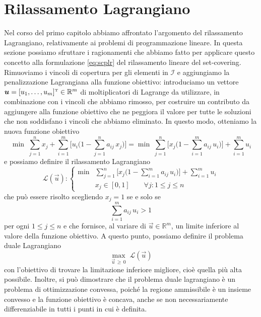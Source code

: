 \section{Rilassamento Lagrangiano}\label{sec:lagrangianrelaxationapplied}
Nel corso del primo capitolo abbiamo affrontato l'argomento del rilassamento Lagrangiano, relativamente ai problemi di
programmazione lineare. In questa sezione possiamo sfruttare i ragionamenti che abbiamo fatto per applicare questo
concetto alla formulazione \eqref{eq:scplr} del rilassamento lineare del set-covering. Rimuoviamo i vincoli di copertura
per gli elementi in \( \mathcal{I} \) e aggiungiamo la penalizzazione Lagrangiana alla funzione obiettivo: introduciamo
un vettore \( \bm{u} = [u_1, \ldots, u_m]^{\scriptscriptstyle\mathrm{T}} \in \mathbb{R}^m \) di moltiplicatori di Lagrange da utilizzare, in
combinazione con i vincoli che abbiamo rimosso, per costruire un contributo da aggiungere alla funzione obiettivo che ne
peggiora il valore per tutte le soluzioni che non soddisfano i vincoli che abbiamo eliminato. In questo modo, otteniamo
la nuova funzione obiettivo
\begin{equation}
    \min \; \sum_{j = 1}^n x_j + \sum_{i = 1}^m \Big[u_i \Big(1 - \sum_{j = 1}^n a_{ij}\, x_j\Big)\Big] =
    \min \; \sum_{j = 1}^n \Big[x_j\Big(1 - \sum_{i = 1}^m a_{ij}\, u_i \Big)\Big] + \sum_{i = 1}^m u_i
\end{equation}
e possiamo definire il rilassamento Lagrangiano
\begin{equation}\label{eq:Lu}
    \mathcal{L}(\vec{u})\colon
    \left\{
    \begin{array}{ll}
        \min & \displaystyle\sum_{j=1}^n \Big[x_j \Big(1 - \sum_{i = 1}^m a_{ij}\, u_i\Big)\Big] + \sum_{i = 1}^m u_i
        \\[20pt]
             & x_j \in [0, 1] \qquad \forall j\colon 1 \leq j \leq n
    \end{array}\right.
\end{equation}
che può essere risolto scegliendo \( x_j = 1\) se e solo se
\begin{equation}
    \sum_{i=1}^m a_{ij}\, u_i > 1
\end{equation}
per ogni \( 1 \leq j \leq n \) e che fornisce, al variare di \( \vec{u} \in \mathbb{R}^m \), un limite inferiore al valore della funzione
obiettivo. A questo punto, possiamo definire il problema duale Lagrangiano
\begin{equation}\label{eq:lagrangianduale}
    \max_{\vec{u} \,\geq\, 0}\; \mathcal{L}(\vec{u})
\end{equation}
con l'obiettivo di trovare la limitazione inferiore migliore, cioè quella più alta possibile. Inoltre, si può dimostrare
che il problema duale lagrangiano è un problema di ottimizzazione convessa, poiché la regione ammissibile è un insieme
convesso e la funzione obiettivo è concava, anche se non necessariamente differenziabile in tutti i punti in cui è
definita.

